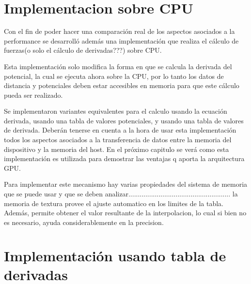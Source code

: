 \section{Implementacion sobre CPU}
Con el fin de poder hacer una comparación real de los aspectos asociados a la performance se desarrolló además una implementación que realiza el cálculo de fuerzas(o solo el cálculo de derivadas???) sobre CPU.

Esta implementación solo modifica la forma en que se calcula la derivada del potencial, la cual se ejecuta ahora sobre la CPU, por lo tanto los datos de distancia y potenciales deben estar accesibles en memoria para que este cálculo pueda ser realizado.

Se implementaron variantes equivalentes para el calculo usando la ecuación derivada, usando una tabla de valores potenciales, y usando una tabla de valores de derivada.
Deberán tenerse en cuenta a la hora de usar esta implementación todos los aspectos asociados a la transferencia de datos entre la memoria del dispositivo y la memoria del host. En el próximo capitulo se verá como esta implementación es utilizada para demostrar las ventajas q aporta la arquitectura GPU.


Para implementar este mecanismo hay varias propiedades del sistema de memoria que se puede usar y que se deben analizar......................................................
la memoria de textura provee el ajuste automatico en los limites de la tabla. Además, permite obtener el valor resultante de la interpolacion, lo cual si bien no es necesario, ayuda considerablemente en la precision.



\section{Implementación usando tabla de derivadas}


